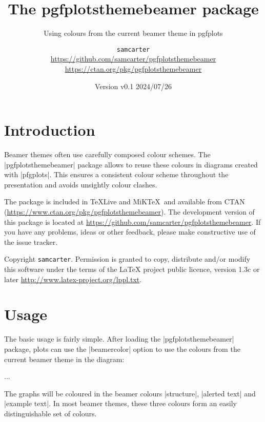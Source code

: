 \documentclass{scrartcl}
\title{The pgfplotsthemebeamer package}
\subtitle{Using colours from the current beamer theme in pgfplots}
\author{%
  \texorpdfstring{
    \texttt{samcarter}\\
    \url{https://github.com/samcarter/pgfplotsthemebeamer}\\
    \url{https://ctan.org/pkg/pgfplotsthemebeamer}
  }{samcarter}}
\date{Version v0.1 \textendash{} 2024/07/26}
\begin{document}
\maketitle

\section{Introduction}
\label{intro}

Beamer themes often use carefully composed colour schemes. The \saminline|pgfplotsthemebeamer| package allows to reuse these colours in diagrams created with \saminline|pfgplots|. This ensures a consistent colour scheme throughout the presentation and avoids unsightly colour clashes.

The package is included in \TeX{}Live and MiK\TeX\ and available from \textsc{CTAN} (\url{https://www.ctan.org/pkg/pgfplotsthemebeamer}).
The development version of this package is located at \url{https://github.com/samcarter/pgfplotsthemebeamer}. If you have any problems, ideas or other feedback, please make constructive use of the issue tracker.

Copyright  \texttt{samcarter}. Permission is granted to copy, distribute and\slash or modify this software under the terms of the LaTeX project public licence, version 1.3c or later \url{http://www.latex-project.org/lppl.txt}.

\section{Usage}

The basic usage is fairly simple. After loading the \saminline|pgfplotsthemebeamer| package, plots can use the \saminline|beamercolor| option to use the colours from the current beamer theme in the diagram:
\begin{tcolorbox}[title={Usage}]
\begin{samcode}
\usepackage{pgfplotsthemebeamer}

\begin{axis}[
  beamercolors
]
...
\end{axis}
\end{samcode}
\end{tcolorbox}
The graphs will be coloured in the beamer colours \saminline|structure|, \saminline|alerted text| and \saminline|example text|. In most beamer themes, these three colours form an easily distinguishable set of colours.
\end{document}

